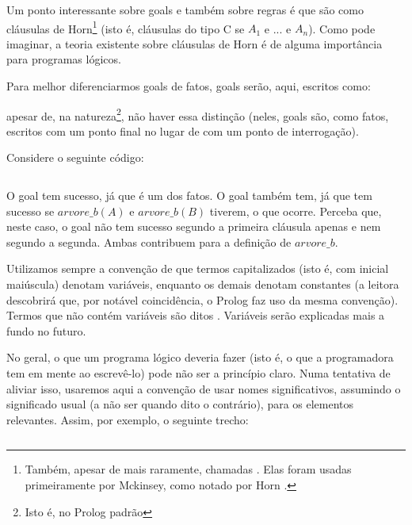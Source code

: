 Um ponto interessante sobre goals e também sobre regras é que são como cláusulas de
Horn\footnote{Também, apesar de mais raramente, chamadas . Elas
  foram usadas primeiramente por Mckinsey, como notado por Horn \cite{horn}.} (isto é, cláusulas do
tipo C se $A_1$ e ... e $A_n$). Como pode imaginar, a teoria existente sobre cláusulas de Horn é de
alguma importância para programas lógicos.

Para melhor diferenciarmos goals de fatos, goals serão, aqui, escritos como:

\noindent apesar de, na natureza\footnote{Isto é, no Prolog padrão}, não haver essa distinção (neles, goals são, como fatos,
escritos com um ponto final no lugar de com um ponto de interrogação).


Considere o seguinte código:\\

    \begin{listing}
\inputminted{prolog}{../Exemplos/Cap0/prog3_arvb.pl}\label{lst:arvb}
    \end{listing}

O goal  tem sucesso, já que é um dos fatos. O goal  também tem, já que  tem sucesso se $arvore\_b(A)$ e $arvore\_b(B)$ tiverem, o que ocorre. Perceba que, neste caso, o goal não tem sucesso segundo a primeira cláusula apenas e nem segundo a segunda. Ambas contribuem para a definição de $arvore\_b$.

Utilizamos sempre a convenção de que termos capitalizados (isto é, com inicial maiúscula) denotam
variáveis, enquanto os demais denotam constantes (a leitora descobrirá que, por notável
coincidência, o Prolog faz uso da mesma convenção). Termos que não
contém variáveis são ditos . Variáveis serão explicadas mais a fundo no futuro.

No geral, o que um programa lógico deveria fazer (isto é, o que a programadora tem em mente ao escrevê-lo) pode não ser a princípio claro. Numa tentativa de aliviar isso, usaremos aqui a convenção de usar nomes significativos, assumindo o significado usual (a não ser quando dito o contrário), para os elementos relevantes. Assim, por exemplo, o seguinte trecho:

    \begin{listing}
\inputminted{prolog}{../Exemplos/Cap0/prog4_pai.pl}\label{lst:pai_filho}
    \end{listing}



